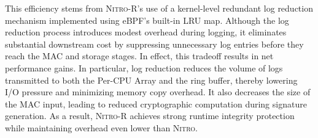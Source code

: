 \documentclass[sigconf]{sty/acmart}
\newcommand{\Sys}{\mbox{\textsc{Nitro}}\xspace}
\newcommand{\SysR}{\mbox{\textsc{Nitro-R}}\xspace}
\begin{document}
\begin{appendix}
This efficiency stems from \SysR's use of a kernel-level redundant log reduction mechanism implemented using eBPF’s built-in LRU map. Although the log reduction process introduces modest overhead during logging, it eliminates substantial downstream cost by suppressing unnecessary log entries before they reach the MAC and storage stages. In effect, this tradeoff results in net performance gains.
In particular, log reduction reduces the volume of logs transmitted to both the Per-CPU Array and the ring buffer, thereby lowering I/O pressure and minimizing memory copy overhead. It also decreases the size of the MAC input, leading to reduced cryptographic computation during signature generation. As a result, \SysR achieves strong runtime integrity protection while maintaining overhead even lower than \Sys.

\end{appendix}

 
\end{document}

